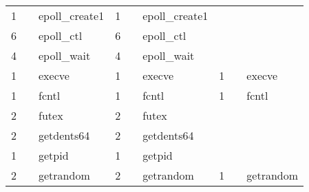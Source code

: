 \documentclass[submit,techreq,noauthor]{eco}	%
\begin{document}
\begin{table*}[t]
\begin{tabular}{|lllllllll|}
  \multicolumn{1}{|l|}{1}     & \multicolumn{1}{l|}{}       & \multicolumn{1}{l|}{epoll\_create1}    & \multicolumn{1}{l|}{1}     & \multicolumn{1}{l|}{}       & \multicolumn{1}{l|}{epoll\_create1}    & \multicolumn{1}{l|}{}      & \multicolumn{1}{l|}{}       &                   \\
  \multicolumn{1}{|l|}{6}     & \multicolumn{1}{l|}{}       & \multicolumn{1}{l|}{epoll\_ctl}        & \multicolumn{1}{l|}{6}     & \multicolumn{1}{l|}{}       & \multicolumn{1}{l|}{epoll\_ctl}        & \multicolumn{1}{l|}{}      & \multicolumn{1}{l|}{}       &                   \\
  \multicolumn{1}{|l|}{4}     & \multicolumn{1}{l|}{}       & \multicolumn{1}{l|}{epoll\_wait}       & \multicolumn{1}{l|}{4}     & \multicolumn{1}{l|}{}       & \multicolumn{1}{l|}{epoll\_wait}       & \multicolumn{1}{l|}{}      & \multicolumn{1}{l|}{}       &                   \\
  \multicolumn{1}{|l|}{1}     & \multicolumn{1}{l|}{}       & \multicolumn{1}{l|}{execve}            & \multicolumn{1}{l|}{1}     & \multicolumn{1}{l|}{}       & \multicolumn{1}{l|}{execve}            & \multicolumn{1}{l|}{1}     & \multicolumn{1}{l|}{}       & execve            \\
  \multicolumn{1}{|l|}{1}     & \multicolumn{1}{l|}{}       & \multicolumn{1}{l|}{fcntl}             & \multicolumn{1}{l|}{1}     & \multicolumn{1}{l|}{}       & \multicolumn{1}{l|}{fcntl}             & \multicolumn{1}{l|}{1}     & \multicolumn{1}{l|}{}       & fcntl             \\
  \multicolumn{1}{|l|}{2}     & \multicolumn{1}{l|}{}       & \multicolumn{1}{l|}{futex}             & \multicolumn{1}{l|}{2}     & \multicolumn{1}{l|}{}       & \multicolumn{1}{l|}{futex}             & \multicolumn{1}{l|}{}      & \multicolumn{1}{l|}{}       &                   \\
  \multicolumn{1}{|l|}{2}     & \multicolumn{1}{l|}{}       & \multicolumn{1}{l|}{getdents64}        & \multicolumn{1}{l|}{2}     & \multicolumn{1}{l|}{}       & \multicolumn{1}{l|}{getdents64}        & \multicolumn{1}{l|}{}      & \multicolumn{1}{l|}{}       &                   \\
  \multicolumn{1}{|l|}{1}     & \multicolumn{1}{l|}{}       & \multicolumn{1}{l|}{getpid}            & \multicolumn{1}{l|}{1}     & \multicolumn{1}{l|}{}       & \multicolumn{1}{l|}{getpid}            & \multicolumn{1}{l|}{}      & \multicolumn{1}{l|}{}       &                   \\
  \multicolumn{1}{|l|}{2}     & \multicolumn{1}{l|}{}       & \multicolumn{1}{l|}{getrandom}         & \multicolumn{1}{l|}{2}     & \multicolumn{1}{l|}{}       & \multicolumn{1}{l|}{getrandom}         & \multicolumn{1}{l|}{1}     & \multicolumn{1}{l|}{}       & getrandom         \\

\end{tabular}
\end{table*}
\end{document}
